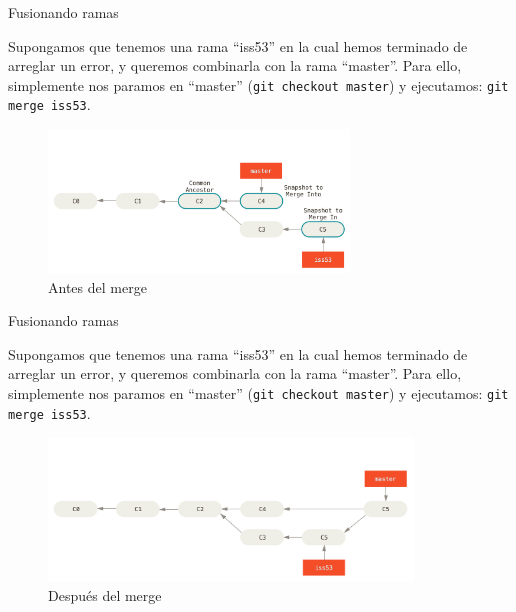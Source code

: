 \documentclass{beamer}
\begin{document}
\begin{frame}{Fusionando ramas}

    Supongamos que tenemos una rama ``iss53'' en la cual hemos terminado de arreglar un error, y queremos combinarla con la rama ``master''.
    Para ello, simplemente nos paramos en ``master'' (\texttt{git checkout master}) y ejecutamos: \texttt{git merge iss53}.

	\begin{figure}[ht]
		\begin{center}
			\includegraphics[height=1.5in]{basic-merging-1.png}
		\end{center}
		\caption{Antes del merge}
	\end{figure}

\end{frame}

\begin{frame}{Fusionando ramas}

    Supongamos que tenemos una rama ``iss53'' en la cual hemos terminado de arreglar un error, y queremos combinarla con la rama ``master''.
    Para ello, simplemente nos paramos en ``master'' (\texttt{git checkout master}) y ejecutamos: \texttt{git merge iss53}.

	\begin{figure}[ht]
		\begin{center}
			\includegraphics[height=1.5in]{basic-merging-2.png}
		\end{center}
		\caption{Después del merge}
	\end{figure}

\end{frame}
\end{document}
